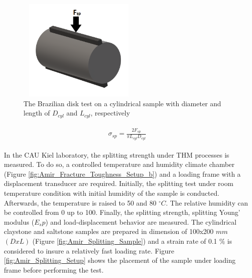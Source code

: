 \begin{figure}[!ht]
\centering
\includegraphics[width=6cm,height=5cm]{figures/Amir_Splitting_Theory.png}
\caption{The Brazilian disk test on a cylindrical sample with diameter and length of $D_{cyl}$ and $L_{cyl}$, respectively}
\label{fig:Amir_Splitting_Theory}
\end{figure} 

\begin{align}
\label{eq:Splitting_Strength}
\begin{split}
\sigma_{sp}=\frac{2F_{sp}}{\pi L_{cyl}D_{cyl}}
\end{split}
\end{align}

In the CAU Kiel laboratory, the splitting strength under THM processes is measured. To do so, a controlled temperature and humidity climate chamber (Figure \ref{fig:Amir_Fracture_Toughness_Setup_b}) and a loading frame with a displacement transducer are required. Initially, the splitting test under room temperature condition with initial humidity of the sample is conducted. Afterwards, the temperature is raised to 50 and 80 $^{\circ}C$. The relative humidity can be controlled from 0 up to 100. Finally, the splitting strength, splitting Young’ modulus ($E_sp$) and load-displacement behavior are measured. The cylindrical claystone and saltstone samples are prepared in dimension of 100x200 $mm$ $(DxL)$ (Figure \ref{fig:Amir_Splitting_Sample}) and a strain rate of  0.1 \% is considered to insure a relatively fast loading rate. Figure \ref{fig:Amir_Splitting_Setup} shows the placement of the sample under loading frame before performing the test.

